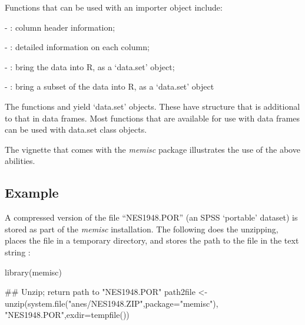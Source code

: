 
Functions that can be used with an importer object include:
\begin{itemizz}
\item[-] : column header information;
\item[-] : detailed information on each column;
\item[-] : bring the data into R, as a `data.set' object;
\item[-] : bring a subset of the data into R, as a `data.set' object
\end{itemizz}

  
The functions
 and  yield `data.set' objects.
These have structure that is additional to that in data frames.  Most
functions that are available for use with data frames can be used with
data.set class objects.

The vignette  that comes with the {\em memisc} package
illustrates the use of the above abilities.

\subsection*{Example}

A compressed version of the file ``NES1948.POR'' (an SPSS `portable' dataset)
is stored as part of the {\em memisc} installation.  The following
does the unzipping, places the file in a temporary directory,
and stores the path to the file in the text string :
\begin{fullwidth}

\begin{Schunk}
\begin{Sinput}
library(memisc)
\end{Sinput}
\begin{Sinput}
## Unzip; return path to "NES1948.POR"
path2file <- unzip(system.file("anes/NES1948.ZIP",package="memisc"),
                     "NES1948.POR",exdir=tempfile())
\end{Sinput}
\end{Schunk}

\end{fullwidth}

